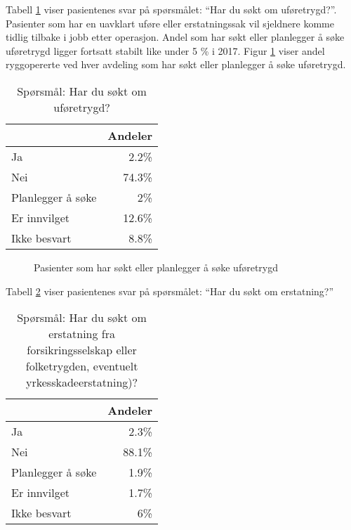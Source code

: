 \documentclass [norsk,a4paper,twoside]{article}\usepackage[]{graphicx}\usepackage[]{color}
\begin{document}
Tabell \ref{tab:Ufor} viser pasientenes svar på spørsmålet: ``Har du søkt om uføretrygd?''.
Pasienter som har en uavklart uføre eller erstatningssak vil sjeldnere komme tidlig tilbake i jobb etter operasjon.
Andel som har søkt eller planlegger å søke uføretrygd ligger fortsatt stabilt like under 5 \% i 2017. 
Figur \ref{fig:Ufor} viser andel ryggopererte ved hver avdeling som har søkt eller planlegger å søke uføretrygd.

\begin{table}[ht]
\centering
\begin{tabular}{lr}
  \hline
 & Andeler \\ 
  \hline
Ja & 2.2\% \\ 
  Nei & 74.3\% \\ 
  Planlegger å søke & 2\% \\ 
  Er innvilget & 12.6\% \\ 
  Ikke besvart & 8.8\% \\ 
   \hline
\end{tabular}
\caption{Spørsmål: Har du søkt om uføretrygd?} 
\label{tab:Ufor}
\end{table}


\begin{figure}[ht]
\caption{\label{fig:Ufor} Pasienter som har søkt eller planlegger å søke uføretrygd} 
\end{figure}

Tabell \ref{tab:Erst} viser pasientenes svar på spørsmålet: ``Har du søkt om erstatning?'' 

\begin{table}[ht]
\centering
\begin{tabular}{lr}
  \hline
 & Andeler \\ 
  \hline
Ja & 2.3\% \\ 
  Nei & 88.1\% \\ 
  Planlegger å søke & 1.9\% \\ 
  Er innvilget & 1.7\% \\ 
  Ikke besvart & 6\% \\ 
   \hline
\end{tabular}
\caption{Spørsmål: Har du søkt om erstatning fra forsikringsselskap eller folketrygden, 
		eventuelt yrkesskadeerstatning)?} 
\label{tab:Erst}
\end{table}
\end{document}
